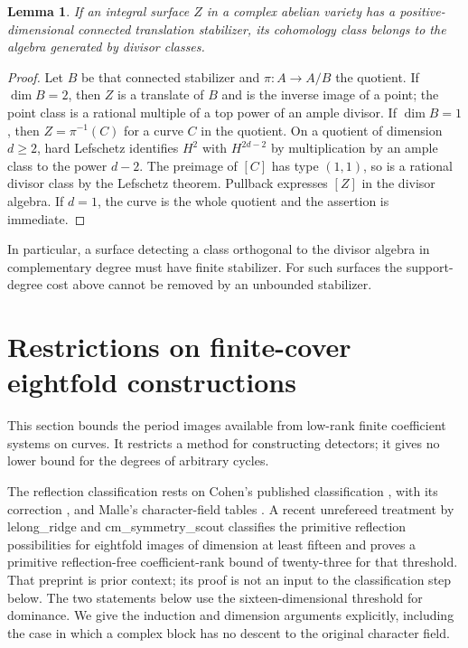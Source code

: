 \documentclass[11pt]{article}
\newtheorem{lemma}[theorem]{Lemma}
\theoremstyle{definition}
\theoremstyle{remark}
\begin{document}
\begin{lemma}\label{lem:surface-stabilizer}
If an integral surface $Z$ in a complex abelian variety has a positive-dimensional connected translation stabilizer, its cohomology class belongs to the algebra generated by divisor classes.
\end{lemma}

\begin{proof}
Let $B$ be that connected stabilizer and $\pi:A\to A/B$ the quotient. If $\dim B=2$, then $Z$ is a translate of $B$ and is the inverse image of a point; the point class is a rational multiple of a top power of an ample divisor. If $\dim B=1$, then $Z=\pi^{-1}(C)$ for a curve $C$ in the quotient. On a quotient of dimension $d\geq2$, hard Lefschetz identifies $H^2$ with $H^{2d-2}$ by multiplication by an ample class to the power $d-2$. The preimage of $[C]$ has type $(1,1)$, so is a rational divisor class by the Lefschetz theorem. Pullback expresses $[Z]$ in the divisor algebra. If $d=1$, the curve is the whole quotient and the assertion is immediate.
\end{proof}

In particular, a surface detecting a class orthogonal to the divisor algebra in complementary degree must have finite stabilizer. For such surfaces the support-degree cost above cannot be removed by an unbounded stabilizer.

\section{Restrictions on finite-cover eightfold constructions}
\label{sec:finite-cover-eightfolds}
This section bounds the period images available from low-rank finite coefficient systems on curves. It restricts a method for constructing detectors; it gives no lower bound for the degrees of arbitrary cycles.

The reflection classification rests on Cohen's published classification \cite[(2.4)--(2.7), pp.~386--390; (4.16), p.~412; (5.11)--(5.14), pp.~432--435]{CohenReflection}, with its correction \cite[p.~613]{CohenCorrection}, and Malle's character-field tables \cite[Tables~8.1--8.2, pp.~674--675; p.~676]{MalleFields}. A recent unrefereed treatment by lelong\_ridge and cm\_symmetry\_scout \cite[Theorems~A--B and \S\S2,5]{ReflectionSources} classifies the primitive reflection possibilities for eightfold images of dimension at least fifteen and proves a primitive reflection-free coefficient-rank bound of twenty-three for that threshold. That preprint is prior context; its proof is not an input to the classification step below. The two statements below use the sixteen-dimensional threshold for dominance. We give the induction and dimension arguments explicitly, including the case in which a complex block has no descent to the original character field.
\end{document}
